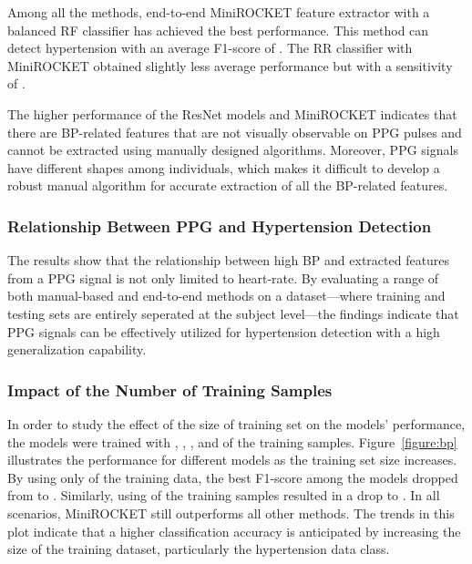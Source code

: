 \documentclass[letterpaper, 10 pt, conference]{ieeeconf}
\begin{document}
Among all the methods, end-to-end MiniROCKET feature extractor with a balanced RF classifier has achieved the best performance. This method can detect hypertension with an average F1-score of . The RR classifier with MiniROCKET obtained slightly less average performance but with a sensitivity of .

The higher performance of the ResNet models and MiniROCKET indicates that there are BP-related features that are not visually observable on PPG pulses and cannot be extracted using manually designed algorithms. Moreover, PPG signals have different shapes among individuals, which makes it difficult to develop a robust manual algorithm for accurate extraction of all the BP-related features.







\subsubsection{Relationship Between PPG and Hypertension Detection}

The results show that the relationship between high BP and extracted features from a PPG signal is not only limited to heart-rate. By evaluating a range of both manual-based and end-to-end methods on a dataset—where training and testing sets are entirely seperated at the subject level—the findings indicate that PPG signals can be effectively utilized for hypertension detection with a high generalization capability.




\subsubsection{Impact of the Number of Training Samples}
In order to study the effect of the size of training set on the models' performance, the models were trained with , , , and  of the training samples. Figure~\ref{figure:bp} illustrates the performance for different models as the training set size increases.
By using only  of the training data, the best F1-score among the models dropped from  to . Similarly, using  of the training samples resulted in a drop to . 
In all scenarios, MiniROCKET still outperforms all other methods. The trends in this plot indicate that a higher classification accuracy is anticipated by increasing the size of the training dataset, particularly the hypertension data class.
\end{document}
